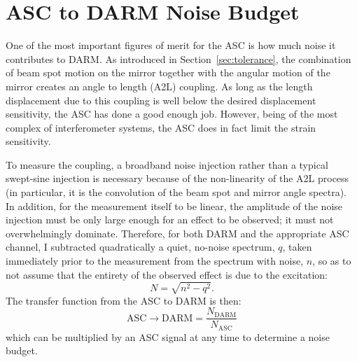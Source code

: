 \section{ASC to DARM Noise Budget}
One of the most important figures of merit for the ASC is how much
noise it contributes to DARM. As introduced in
Section~\ref{sec:tolerance}, the combination of beam spot motion on
the mirror together with the angular motion of the mirror creates an
angle to length (A2L) coupling. As long as the length displacement due
to this coupling is well below the desired displacement sensitivity,
the ASC has done a good enough job. However, being of the most
complex of interferometer systems, the ASC does in fact limit the
strain sensitivity.

To measure the coupling, a broadband noise injection rather than a
typical swept-sine injection is necessary because of the non-linearity of the
A2L process (in particular, it is the convolution of the beam spot and
mirror angle spectra). In addition, for the measurement itself to be
linear, the amplitude of the noise injection must be only large enough
for an effect to be observed; it must not overwhelmingly
dominate. Therefore, for both DARM and the appropriate ASC channel, I
subtracted quadratically a quiet, no-noise spectrum, $q$, taken
immediately prior to the measurement from the spectrum with noise,
$n$, so as to not assume that the entirety of the observed effect is
due to the excitation:
\begin{equation}
N = \sqrt{n^2 - q^2}.
\end{equation}
The transfer function from the ASC to DARM is then:
\begin{equation}
\mathrm{ASC} \rightarrow \mathrm{DARM} = \frac{N_{\mathrm{DARM}}}{N_{\mathrm{ASC}}}
\end{equation}
which can be multiplied by an ASC signal at any time to determine a
noise budget.

